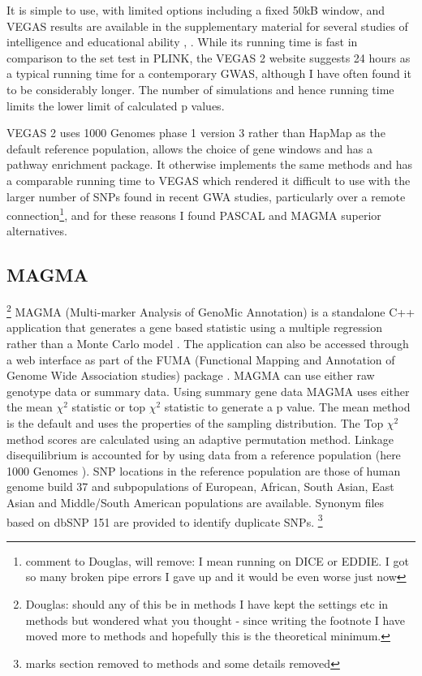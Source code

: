 It is simple to use, with limited options including a fixed 50kB window, and VEGAS results are available in the supplementary material for several studies of intelligence and educational ability \cite{davies2011genome}, \cite{hill2014human} \cite{rietveld2013gwas}. While its running time is fast in comparison to the set test in PLINK, the VEGAS 2 website suggests 24 hours as a typical running time for a contemporary GWAS, although I have often found it to be considerably longer. The number of simulations and hence running time limits the lower limit of calculated p values\cite{lamparter2016fast}.

VEGAS 2 \cite{mishra2015vegas2} uses 1000 Genomes phase 1 version 3 \cite{danecek2011variant} rather than HapMap as the default reference population, allows the choice  of gene windows  and has a pathway enrichment package. It otherwise implements the same methods and has a comparable running time to VEGAS which rendered it difficult to use with the larger number of SNPs found in recent GWA studies, particularly over a remote connection\footnote{comment to Douglas, will remove: I mean running on DICE or EDDIE. I got so many broken pipe errors I gave up and it would be even worse just now}, and for these reasons I found PASCAL and MAGMA superior alternatives. %


\subsection{MAGMA}
\label{sec:MAGMA_gene_scores}
\footnote{ Douglas: should any of this be in methods I have kept the settings etc in methods but wondered what you thought - since writing the footnote I have moved more to methods and hopefully this is the theoretical minimum.}
MAGMA (Multi-marker Analysis of GenoMic Annotation) is a standalone C++ application that generates a gene based statistic using a multiple regression rather than a Monte Carlo model \cite{de2015magma}. The application can also be accessed through a web interface as part of the FUMA (Functional Mapping and Annotation of Genome Wide Association studies) package \cite{watanabe2017functional}. MAGMA can use either raw genotype data or summary data. Using summary gene data MAGMA uses either the mean $\chi^2$ statistic or top $\chi^2$ statistic to generate a p value. The mean method is the default and uses the properties of the sampling distribution.\cite{brown1975400} The Top $\chi^2$ method scores are calculated using an adaptive permutation method.   Linkage disequilibrium is accounted for by using  data from a reference population (here 1000 Genomes \cite{10002012integrated}). SNP locations in the reference population are those of human genome build 37 and subpopulations of European, African, South Asian, East Asian and Middle/South American populations are available. Synonym files based on dbSNP 151 are provided to identify duplicate SNPs. \footnote{marks section removed to methods and some details removed} 
 
